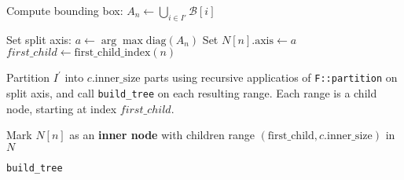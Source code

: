 \begin{algorithm}[!t]
\SetAlgoLined
{}

Compute bounding box: $A_n \gets \bigcup_{i \in I'} \mathcal{B}[i]$\;


Set split axis: $a \gets \arg\max \mathrm{diag}(A_n)$\;
Set $N[n].\mathrm{axis} \gets a$\;
\hspace{1em} $first\_child \gets \mathrm{first\_child\_index}(n)$\;

Partition $I^\prime$ into $c.\mathrm{inner\_size}$ parts using recursive applicatios of \texttt{F::partition} on split axis,
and call \texttt{build\_tree} on each resulting range. Each range
is a child node, starting at index $first\_child$.

Mark $N[n]$ as an \textbf{inner node} with children range
$(\mathrm{first\_child}, c.\mathrm{inner\_size})$ in $N$\;

\caption{\texttt{build\_tree}}
\label{alg:build-tree}
\end{algorithm}

